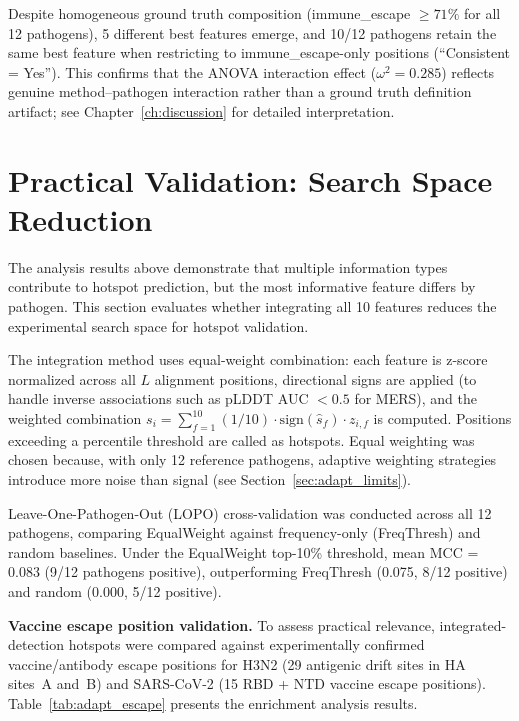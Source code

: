 Despite homogeneous ground truth composition (immune\_escape $\geq 71\%$ for all 12 pathogens), 5 different best features emerge, and 10/12 pathogens retain the same best feature when restricting to immune\_escape-only positions (``Consistent = Yes'').
This confirms that the ANOVA interaction effect ($\omega^2 = 0.285$) reflects genuine method--pathogen interaction rather than a ground truth definition artifact; see Chapter~\ref{ch:discussion} for detailed interpretation.

\section{Practical Validation: Search Space Reduction}
\label{sec:adapt_practical}

The analysis results above demonstrate that multiple information types contribute to hotspot prediction, but the most informative feature differs by pathogen. This section evaluates whether integrating all 10 features reduces the experimental search space for hotspot validation.

The integration method uses equal-weight combination: each feature is z-score normalized across all $L$ alignment positions, directional signs are applied (to handle inverse associations such as pLDDT AUC $< 0.5$ for MERS), and the weighted combination $s_i = \sum_{f=1}^{10} (1/10) \cdot \mathrm{sign}(\hat{s}_f) \cdot z_{i,f}$ is computed. Positions exceeding a percentile threshold are called as hotspots. Equal weighting was chosen because, with only 12 reference pathogens, adaptive weighting strategies introduce more noise than signal (see Section~\ref{sec:adapt_limits}).

Leave-One-Pathogen-Out (LOPO) cross-validation was conducted across all 12 pathogens, comparing EqualWeight against frequency-only (FreqThresh) and random baselines.
Under the EqualWeight top-10\% threshold, mean MCC = 0.083 (9/12 pathogens positive), outperforming FreqThresh (0.075, 8/12 positive) and random (0.000, 5/12 positive).

\textbf{Vaccine escape position validation.}
To assess practical relevance, integrated-detection hotspots were compared against experimentally confirmed vaccine/antibody escape positions for H3N2 (29 antigenic drift sites in HA sites~A and~B) and SARS-CoV-2 (15 RBD + NTD vaccine escape positions).
Table~\ref{tab:adapt_escape} presents the enrichment analysis results.

